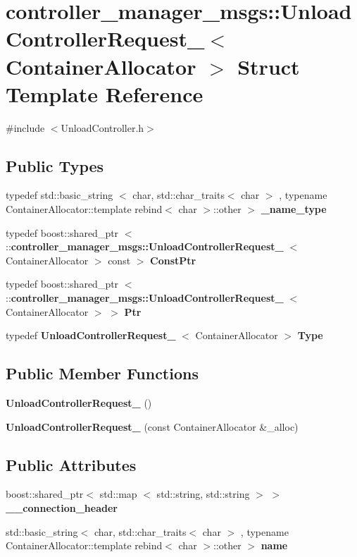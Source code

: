 \section{controller\-\_\-manager\-\_\-msgs\-:\-:\-Unload\-Controller\-Request\-\_\-$<$ \-Container\-Allocator $>$ \-Struct \-Template \-Reference}
\label{structcontroller__manager__msgs_1_1UnloadControllerRequest__}


{\ttfamily \#include $<$\-Unload\-Controller.\-h$>$}

\subsection*{\-Public \-Types}
\begin{DoxyCompactItemize}
\item 
typedef std\-::basic\-\_\-string\*
$<$ char, std\-::char\-\_\-traits$<$ char $>$\*
, typename \*
\-Container\-Allocator\-::template \*
rebind$<$ char $>$\-::other $>$ {\bf \-\_\-name\-\_\-type}
\item 
typedef boost\-::shared\-\_\-ptr\*
$<$ \-::{\bf controller\-\_\-manager\-\_\-msgs\-::\-Unload\-Controller\-Request\-\_\-}\*
$<$ \-Container\-Allocator $>$ const  $>$ {\bf \-Const\-Ptr}
\item 
typedef boost\-::shared\-\_\-ptr\*
$<$ \-::{\bf controller\-\_\-manager\-\_\-msgs\-::\-Unload\-Controller\-Request\-\_\-}\*
$<$ \-Container\-Allocator $>$ $>$ {\bf \-Ptr}
\item 
typedef \*
{\bf \-Unload\-Controller\-Request\-\_\-}\*
$<$ \-Container\-Allocator $>$ {\bf \-Type}
\end{DoxyCompactItemize}
\subsection*{\-Public \-Member \-Functions}
\begin{DoxyCompactItemize}
\item 
{\bf \-Unload\-Controller\-Request\-\_\-} ()
\item 
{\bf \-Unload\-Controller\-Request\-\_\-} (const \-Container\-Allocator \&\-\_\-alloc)
\end{DoxyCompactItemize}
\subsection*{\-Public \-Attributes}
\begin{DoxyCompactItemize}
\item 
boost\-::shared\-\_\-ptr$<$ std\-::map\*
$<$ std\-::string, std\-::string $>$ $>$ {\bf \-\_\-\-\_\-connection\-\_\-header}
\item 
std\-::basic\-\_\-string$<$ char, \*
std\-::char\-\_\-traits$<$ char $>$\*
, typename \*
\-Container\-Allocator\-::template \*
rebind$<$ char $>$\-::other $>$ {\bf name}
\end{DoxyCompactItemize}



